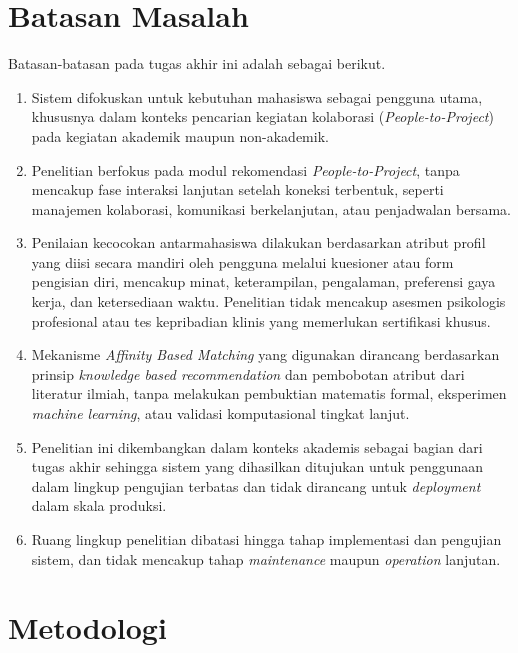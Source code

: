 \section{Batasan Masalah}

Batasan-batasan pada tugas akhir ini adalah sebagai berikut.

\begin{enumerate}
\item Sistem difokuskan untuk kebutuhan mahasiswa sebagai pengguna utama, khususnya dalam konteks pencarian kegiatan kolaborasi (\emph{People-to-Project}) pada kegiatan akademik maupun non-akademik.
\item Penelitian berfokus pada modul rekomendasi \emph{People-to-Project}, tanpa mencakup fase interaksi lanjutan setelah koneksi terbentuk, seperti manajemen kolaborasi, komunikasi berkelanjutan, atau penjadwalan bersama.
\item Penilaian kecocokan antarmahasiswa dilakukan berdasarkan atribut profil yang diisi secara mandiri oleh pengguna melalui kuesioner atau form pengisian diri, mencakup minat, keterampilan, pengalaman, preferensi gaya kerja, dan ketersediaan waktu. Penelitian tidak mencakup asesmen psikologis profesional atau tes kepribadian klinis yang memerlukan sertifikasi khusus.
\item Mekanisme \emph{Affinity Based Matching} yang digunakan dirancang berdasarkan prinsip \emph{knowledge based recommendation} dan pembobotan atribut dari literatur ilmiah, tanpa melakukan pembuktian matematis formal, eksperimen \emph{machine learning}, atau validasi komputasional tingkat lanjut.
\item Penelitian ini dikembangkan dalam konteks akademis sebagai bagian dari tugas akhir sehingga sistem yang dihasilkan ditujukan untuk penggunaan dalam lingkup pengujian terbatas dan tidak dirancang untuk \emph{deployment} dalam skala produksi.
\item Ruang lingkup penelitian dibatasi hingga tahap implementasi dan pengujian sistem, dan tidak mencakup tahap \emph{maintenance} maupun \emph{operation} lanjutan.
\end{enumerate}

\section{Metodologi}


